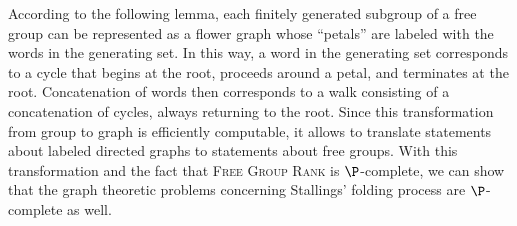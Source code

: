 \documentclass{article}
\newcommand{\FGR}{\textsc{Free Group Rank}}
\begin{document}
%
According to the following lemma, each finitely generated subgroup of a free group can be represented as a flower graph whose ``petals'' are labeled with the words in the generating set.
In this way, a word in the generating set corresponds to a cycle that begins at the root, proceeds around a petal, and terminates at the root.
Concatenation of words then corresponds to a walk consisting of a concatenation of cycles, always returning to the root.
Since this transformation from group to graph is efficiently computable, it allows to translate statements about labeled directed graphs to statements about free groups.
With this transformation and the fact that \FGR{} is $\P$-complete, we can show that the graph theoretic problems concerning Stallings' folding process are $\P$-complete as well.
\end{document}
